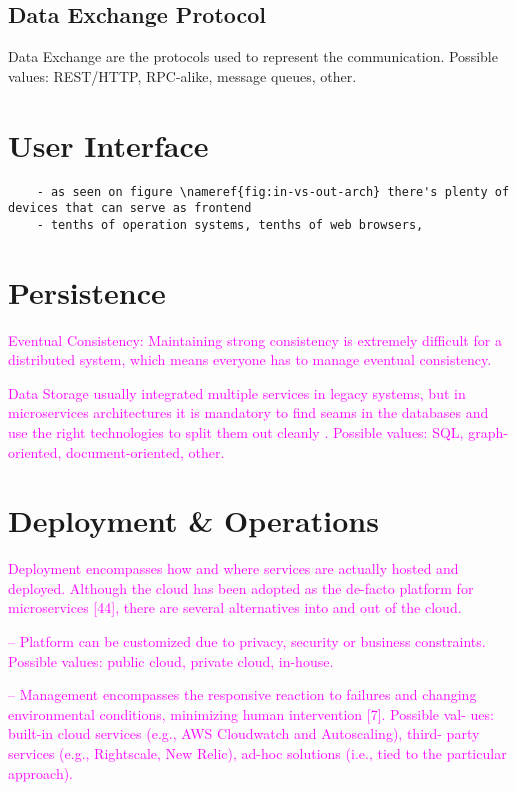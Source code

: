 \documentclass[thesis=M,english,hidelinks]{FITthesis}[2012/10/20]
\begin{document}
\subsection{Data Exchange Protocol}
Data Exchange are the protocols used to represent the communication. Possible values: REST/HTTP, RPC-alike, message queues, other.



\section{User Interface}
\begin{verbatim}
    - as seen on figure \nameref{fig:in-vs-out-arch} there's plenty of devices that can serve as frontend
    - tenths of operation systems, tenths of web browsers,  
\end{verbatim}

\section{Persistence}

\textcolor{magenta}{Eventual Consistency: Maintaining strong consistency is extremely difficult for a distributed system, which means everyone has to manage eventual consistency.}

\textcolor{magenta}{Data Storage usually integrated multiple services in legacy systems, but in microservices architectures it is mandatory to find seams in the databases and use the right technologies to split them out cleanly \cite{ms-building-ms}. Possible values: SQL, graph-oriented, document-oriented, other.}

\section{Deployment \& Operations}
\textcolor{magenta}{Deployment encompasses how and where services are actually hosted and deployed. Although the cloud has been adopted as the de-facto platform for microservices [44], there are several alternatives into and out of the cloud.}

\textcolor{magenta}{– Platform can be customized due to privacy, security or business constraints. Possible values: public cloud, private cloud, in-house.}

\textcolor{magenta}{– Management encompasses the responsive reaction to failures and changing environmental conditions, minimizing human intervention [7]. Possible val- ues: built-in cloud services (e.g., AWS Cloudwatch and Autoscaling), third- party services (e.g., Rightscale, New Relic), ad-hoc solutions (i.e., tied to the particular approach).}
\end{document}
